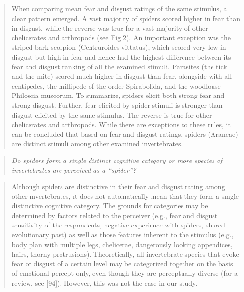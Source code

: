 \documentclass[
]{book}
\begin{document}
\begin{quote}
When comparing mean fear and disgust ratings of the same stimulus, a clear pattern emerged. A vast majority of spiders scored higher in fear than in disgust, while the reverse was true for a vast majority of other chelicerates and arthropods (see Fig 2). An important exception was the striped bark scorpion (Centruroides vittatus), which scored very low in disgust but high in fear and hence had the highest difference between its fear and disgust ranking of all the examined stimuli. Parasites (the tick and the mite) scored much higher in disgust than fear, alongside with all centipedes, the millipede of the order Spirabolida, and the woodlouse Philoscia muscorum. To summarize, spiders elicit both strong fear and strong disgust. Further, fear elicited by spider stimuli is stronger than disgust elicited by the same stimulus. The reverse is true for other chelicerates and arthropods. While there are exceptions to these rules, it can be concluded that based on fear and disgust ratings, spiders (Araneae) are distinct stimuli among other examined invertebrates.
\end{quote}

\begin{quote}
\emph{Do spiders form a single distinct cognitive category or more species of invertebrates are perceived as a ``spider''?}
\end{quote}

\begin{quote}
Although spiders are distinctive in their fear and disgust rating among other invertebrates, it does not automatically mean that they form a single distinctive cognitive category. The grounds for categories may be determined by factors related to the perceiver (e.g., fear and disgust sensitivity of the respondents, negative experience with spiders, shared evolutionary past) as well as those features inherent to the stimulus (e.g., body plan with multiple legs, chelicerae, dangerously looking appendices, hairs, thorny protrusions). Theoretically, all invertebrate species that evoke fear or disgust of a certain level may be categorized together on the basis of emotional percept only, even though they are perceptually diverse (for a review, see {[}94{]}). However, this was not the case in our study.
\end{quote}
\end{document}
